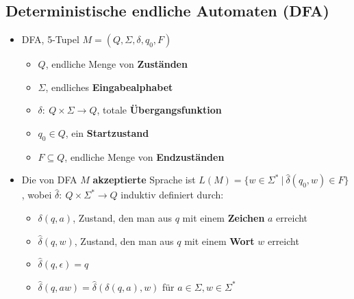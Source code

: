 \documentclass[ieeetran]{article}
\begin{document}
\subsection{Deterministische endliche Automaten (DFA)} %
\label{sub:deterministische_endliche_automaten_dFA_}

\begin{itemize}
  \item DFA, 5-Tupel $M = (Q,\Sigma,\delta,q_0, F)$
	 \begin{itemize}
	   \item $Q$, endliche Menge von \textbf{Zuständen}
	\item $\Sigma$, endliches \textbf{Eingabealphabet} 
	\item $\delta : \ Q \times \Sigma \rightarrow Q$, totale \textbf{Übergangsfunktion}
	\item $q_0 \in Q$, ein \textbf{Startzustand}
	\item $F \subseteq Q$, endliche Menge von \textbf{Endzuständen} 
	 \end{itemize}

 \item Die von DFA $M$ \textbf{akzeptierte} Sprache ist $L(M) = \{ w \in \Sigma^* \ | \ \hat{\delta}(q_0,w) \in F \}$, wobei $\hat{\delta}: \ Q \times \Sigma^* \rightarrow Q$ induktiv definiert durch:
	 \begin{itemize}
		 \item $\delta(q,a)$, Zustand, den man aus $q$ mit einem \textbf{Zeichen} $a$ erreicht
		 \item $\hat{\delta}(q,w)$, Zustand, den man aus $q$ mit einem \textbf{Wort} $w$ erreicht
		 \item $\hat{\delta}(q,\epsilon) = q$
		 \item $\hat{\delta}(q,aw) = \hat{\delta}(\delta(q,a),w)$ für $a \in \Sigma, w \in \Sigma^*$

	 \end{itemize}
\end{itemize}
\end{document}
